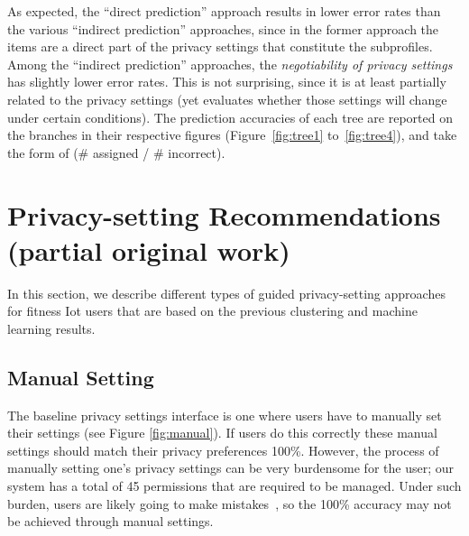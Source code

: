 As expected, the ``direct prediction'' approach results in lower error rates than the various ``indirect prediction'' approaches, since in the former approach the items are a direct part of the privacy settings that constitute the subprofiles. Among the ``indirect prediction'' approaches, the \textit{negotiability of privacy settings} has slightly lower error rates. This is not surprising, since it is at least partially related to the privacy settings (yet evaluates whether those settings will change under certain conditions). The prediction accuracies of each tree are reported on the branches in their respective figures (Figure~\ref{fig:tree1} to~\ref{fig:tree4}), and take the form of (\# assigned / \# incorrect). 

\section{Privacy-setting Recommendations (partial original work)}
In this section, we describe different types of guided privacy-setting approaches for fitness Iot users that are based on the previous clustering and machine learning results. 

\subsection{Manual Setting}
\label{sec:manual}

The baseline privacy settings interface is one where users have to manually set their settings (see Figure \ref{fig:manual}). If users do this correctly these manual settings should match their privacy preferences 100\%. However, the process of manually setting one's privacy settings can be very burdensome for the user; our system has a total of 45 permissions that are required to be managed. Under such burden, users are likely going to make mistakes~\cite{madejski2012study}, so the 100\% accuracy may not be achieved through manual settings.

